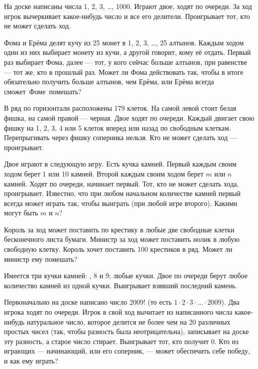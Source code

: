\documentclass[a4paper,12pt]{article}
\begin{document}
На доске написаны числа 1, 2, 3, \dots, 1000. Играют двое,
ходят по очереди. За ход игрок вычеркивает какое-нибудь число
и все его делители. Проигрывает тот, кто не может сделать ход.

Фома и Ерёма делят кучу из 25 монет в 1, 2, 3, \dots, 25
алтынов.  Каждым ходом один из них выбирает монету из кучи, а другой
говорит, кому её отдать. Первый раз выбирает Фома, далее --- тот, у кого
сейчас больше алтынов, при равенстве --- тот же, кто в прошлый раз.  Может ли
Фома действовать так, чтобы в итоге обязательно получить больше алтынов,
чем Ерёма,
или Ерёма всегда сможет~Фоме~\hbox{помешать?}




В ряд по  горизонтали расположены 179 клеток.  На  самой
левой стоит белая фишка, на самой правой ---  черная.  Двое  ходят  по
очереди. Каждый двигает свою фишку на 1, 2, 3, 4 или 5 клеток  вперед  или
назад по свободным клеткам. Перепрыгивать через фишку соперника  нельзя.
Кто не может сделать ход --- проигрывает.


Двое играют в следующую игру. Есть кучка камней.
Первый каждым своим ходом берет 1 или 10 камней.
Второй каждым своим ходом берет $m$ или $n$ камней.
Ходят по очереди, начинает первый.
Тот, кто не может сделать
хода, проигрывает. Известно, что при любом
начальном количестве камней первый  всегда
может играть так, чтобы выиграть (при любой игре второго).
Какими могут быть $m$ и $n$?

Король за ход может поставить по крестику в любые две свободные клетки
бесконечного листа бумаги. Министр за ход может поставить нолик в любую
свободную клетку. Король хочет поставить 100 крестиков в ряд.
Может ли министр ему помешать?


 Имеется три кучки камней:
, 8 и 9;
 любые кучки. Двое по очереди берут любое количество камней из
одной кучки. Выигрывает взявший последний камень.

Первоначально на доске написано число 2009!
(то есть $1\cdot2\cdot3\cdot\ldots\cdot2009$).
Два игрока ходят по очереди. Игрок в свой ход вычитает
из написанного  числа какое-нибудь натуральное число,  которое
делится не более  чем  на 20 различных простых чисел (так,  чтобы
разность была неотрицательна), записывает  на  доске эту разность,
а старое число стирает. Выигрывает тот, кто получит 0.
Кто из играющих --- начинающий, или его соперник, --- может %
обеспечить
себе победу, и как ему %
играть?
\end{document}
